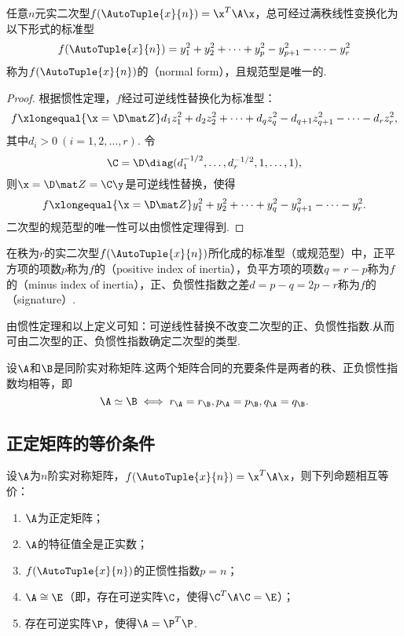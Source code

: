 \begin{corollary}
任意\(n\)元实二次型\(f(\AutoTuple{x}{n}) = \x^T\A\x\)，总可经过满秩线性变换化为以下形式的标准型\[
f(\AutoTuple{x}{n})
=y_1^2+y_2^2+ \dotsb +y_p^2
-y_{p+1}^2-\dotsb-y_r^2
\]称为\(f(\AutoTuple{x}{n})\)的（{\rm normal form}），且规范型是唯一的.
\begin{proof}
根据惯性定理，\(f\)经过可逆线性替换化为标准型：\[
f \xlongequal{\x=\D\z} d_1 z_1^2 + d_2 z_2^2 + \dotsb + d_q z_q^2 - d_{q+1} z_{q+1}^2 - \dotsb - d_r z_r^2,
\]其中\(d_i>0\ (i=1,2,\dotsc,r)\).
令\[
\C = \D \diag(d_1^{-1/2},\dotsc,d_r^{-1/2},1,\dotsc,1),
\]则\(\x = \D\z = \C\y\)是可逆线性替换，使得\[
f \xlongequal{\x=\D\z} y_1^2 + y_2^2 + \dotsb + y_q^2 - y_{q+1}^2 - \dotsb - y_r^2.
\]二次型的规范型的唯一性可以由惯性定理得到.
\end{proof}
\end{corollary}

\begin{definition}
在秩为\(r\)的实二次型\(f(\AutoTuple{x}{n})\)所化成的标准型（或规范型）中，正平方项的项数\(p\)称为\(f\)的（positive index of inertia），负平方项的项数\(q=r-p\)称为\(f\)的（minus index of inertia），正、负惯性指数之差\(d=p-q=2p-r\)称为\(f\)的（signature）.
\end{definition}
由惯性定理和以上定义可知：可逆线性替换不改变二次型的正、负惯性指数.从而可由二次型的正、负惯性指数确定二次型的类型.

\begin{theorem}
设\(\A\)和\(\B\)是同阶实对称矩阵.这两个矩阵合同的充要条件是两者的秩、正负惯性指数均相等，即\[
\A\simeq\B \iff r_{\A}=r_{\B}, p_{\A}=p_{\B}, q_{\A}=q_{\B}.
\]
\end{theorem}

\subsection{正定矩阵的等价条件}
\begin{theorem}
设\(\A\)为\(n\)阶实对称矩阵，\(f(\AutoTuple{x}{n}) = \x^T\A\x\)，则下列命题相互等价：
\begin{enumerate}
\item \(\A\)为正定矩阵；
\item \(\A\)的特征值全是正实数；
\item \(f(\AutoTuple{x}{n})\)的正惯性指数\(p=n\)；
\item \(\A \cong \E\)（即，存在可逆实阵\(\C\)，使得\(\C^T\A\C=\E\)）；
\item 存在可逆实阵\(\P\)，使得\(\A=\P^T\P\).
\end{enumerate}
\end{theorem}

